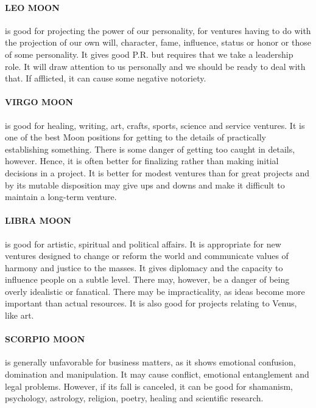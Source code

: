  

\paragraph{LEO MOON} is good for projecting the power of our personality, for ventures having to do with the projection of our own will, character, fame, influence, status or honor or those of some personality. It gives good P.R. but requires that we take a leadership role. It will draw attention to us personally and we should be ready to deal with that. If afflicted, it can cause some negative notoriety.

 

\paragraph{VIRGO MOON} is good for healing, writing, art, crafts, sports, science and service ventures. It is one of the best Moon positions for getting to the details of practically establishing something. There is some danger of getting too caught in details, however. Hence, it is often better for finalizing rather than making initial decisions in a project. It is better for modest ventures than for great projects and by its mutable disposition may give ups and downs and make it difficult to maintain a long-term venture.

 

\paragraph{LIBRA MOON} is good for artistic, spiritual and political affairs. It is appropriate for new ventures designed to change or reform the world and communicate values of harmony and justice to the masses. It gives diplomacy and the capacity to influence people on a subtle level. There may, however, be a danger of being overly idealistic or fanatical. There may be impracticality, as ideas become more important than actual resources. It is also good for projects relating to Venus, like art.

 

\paragraph{SCORPIO MOON} is generally unfavorable for business matters, as it shows emotional confusion, domination and manipulation. It may cause conflict, emotional entanglement and legal problems. However, if its fall is canceled, it can be good for shamanism, psychology, astrology, religion, poetry, healing and scientific research.   

